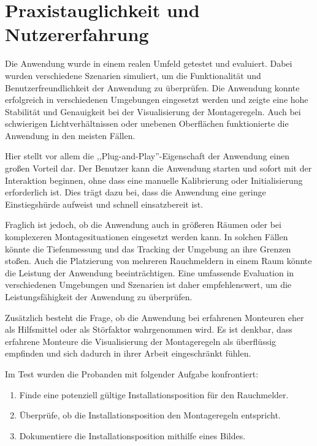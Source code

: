 \section{Praxistauglichkeit und Nutzererfahrung}

Die Anwendung wurde in einem realen Umfeld getestet und evaluiert. Dabei wurden verschiedene Szenarien simuliert, um die Funktionalität und Benutzerfreundlichkeit der Anwendung zu überprüfen. Die Anwendung konnte erfolgreich in verschiedenen Umgebungen eingesetzt werden und zeigte eine hohe Stabilität und Genauigkeit bei der Visualisierung der Montageregeln. Auch bei schwierigen Lichtverhältnissen oder unebenen Oberflächen funktionierte die Anwendung in den meisten Fällen.

Hier stellt vor allem die ,,Plug-and-Play''-Eigenschaft der Anwendung einen großen Vorteil dar. Der Benutzer kann die Anwendung starten und sofort mit der Interaktion beginnen, ohne dass eine manuelle Kalibrierung oder Initialisierung erforderlich ist. Dies trägt dazu bei, dass die Anwendung eine geringe Einstiegshürde aufweist und schnell einsatzbereit ist.

Fraglich ist jedoch, ob die Anwendung auch in größeren Räumen oder bei komplexeren Montagesituationen  eingesetzt werden kann. In solchen Fällen könnte die Tiefenmessung und das Tracking der Umgebung an ihre Grenzen stoßen. Auch die Platzierung von mehreren Rauchmeldern in einem Raum könnte die Leistung der Anwendung beeinträchtigen. Eine umfassende Evaluation in verschiedenen Umgebungen und Szenarien ist daher empfehlenswert, um die Leistungsfähigkeit der Anwendung zu überprüfen.

Zusätzlich besteht die Frage, ob die Anwendung bei erfahrenen Monteuren eher als Hilfsmittel oder als Störfaktor wahrgenommen wird. Es ist denkbar, dass erfahrene Monteure die Visualisierung der Montageregeln als überflüssig empfinden und sich dadurch in ihrer Arbeit eingeschränkt fühlen. 

Im Test wurden die Probanden mit folgender Aufgabe konfrontiert:
\begin{enumerate}
    \item Finde eine potenziell gültige Installationsposition für den Rauchmelder.
    \item Überprüfe, ob die Installationsposition den Montageregeln entspricht.
    \item Dokumentiere die Installationsposition mithilfe eines Bildes.
\end{enumerate}

